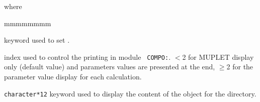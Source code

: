 \noindent where
\begin{ListeDeDescription}{mmmmmmmm}

\item[\moc{EDIT}] keyword used to set .

\item[\dusa{iprint}] index used to control the printing in module {\tt
COMPO:}. $<$2 for MUPLET display only (default value) and parameters values are presented at the end, $\ge$2 for the parameter value display for each calculation.

\item[\moc{DB-STRUC}] {\tt character*12} keyword used to display the content of the  object for the  directory.

\end{ListeDeDescription}

\clearpage
